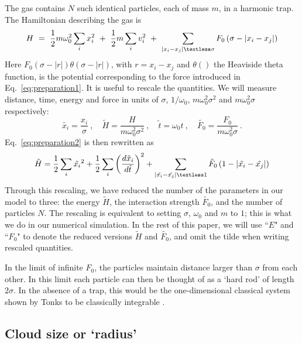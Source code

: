 \documentclass[a4paper, onecolumn]{revtex4-1}
\begin{document}
The gas contains $N$ such identical particles, each of mass $m$, in a harmonic trap.  The
Hamiltonian describing the gas is 
\begin{equation}
  H ~=~
  \frac{1}{2}m\omega_0^2\sum_{i}x_i^2
  ~+~ \frac{1}{2}m\sum_i  v_i^2
  ~+~ \sum_{\left|x_i-x_j\right|\textless\sigma}F_0\left(\sigma-\left|x_i-x_j\right|\right)
\label{eq:preparation2}
\end{equation}
%
Here $F_0\left(\sigma-\left|r\right|\right)\theta(\sigma-|r|)$, with $r=x_i-x_j$ and $\theta()$ the
Heaviside theta function, is the potential corresponding to the force introduced in
Eq.\ \eqref{eq:preparation1}.
%
It is useful to rescale the quantities.  We will measure distance, time, energy and force in units
of $\sigma$, $1/\omega_0$, $m\omega_0^2\sigma^2$ and $m\omega_0^2\sigma$ respectively:
\begin{equation} \label{eq:transform}
  \tilde{x_i} = \frac{x_i}{\sigma}\ , \quad 
  \tilde{H} = \frac{H}{m\omega_0^2\sigma^2}\ ,  \quad \tilde{t} = \omega_0t \ ,  \quad 
\tilde{F_0} = \frac{F_0}{m\omega_0^2\sigma}\ .
\end{equation}
%
Eq.~\ref{eq:preparation2} is then rewritten as
\begin{equation}
  \tilde{H} =
  \frac{1}{2}\sum_{i}\tilde{x_i}^2
  + \frac{1}{2}\sum_i\left(\frac{d\tilde{x}_i}{d\tilde{t}}\right)^2 
  + \sum_{\left|\tilde{x_i}-\tilde{x_j}\right|\textless
    1}\tilde{F}_0\left(1-\left|\tilde{x_i}-\tilde{x_j}\right|\right)  
\end{equation}
%
Through this rescaling, we have reduced the number of the parameters in our model to three: the
energy $\tilde{H}$, the interaction strength $\tilde{F_0}$, and the number of particles $N$.  The
rescaling is equivalent to setting $\sigma$, $\omega_0$ and $m$ to $1$; this is what we do in our
numerical simulation.  In the rest of this paper, we will use ``$E$" and ``$F_0$" to denote the
reduced versions $\tilde{H}$ and $\tilde{F_0}$, and omit the tilde when writing rescaled
quantities. 

In the limit of infinite $F_0$, the particles maintain distance larger than $\sigma$ from each
other.  In this limit each particle can then be thought of as a `hard rod' of length $2\sigma$.  In
the absence of a trap, this would be the one-dimensional classical system shown by Tonks to be
classically integrable \cite{Tonks_1936}.


\subsection{Cloud size or `radius'}
\end{document}
